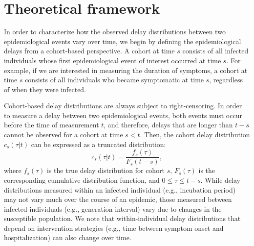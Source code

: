 \documentclass[12pt]{article}
\begin{document}
\section{Theoretical framework}

In order to characterize how the observed delay distributions between two epidemiological events vary over time, we begin by defining the epidemiological delays from a cohort-based perspective.
A cohort at time $s$ consists of all infected individuals whose first epidemiological event of interest occurred at time $s$.
For example, if we are interested in measuring the duration of symptoms, a cohort at time $s$ consists of all individuals who became symptomatic at time $s$, regardless of when they were infected.

Cohort-based delay distributions are always subject to right-censoring.
In order to measure a delay between two epidemiological events, both events must occur before the time of measurement $t$, and therefore, delays that are longer than $t-s$ cannot be observed for a cohort at time $s < t$.
Then, the cohort delay distribution $c_s(\tau|t)$ can be expressed as a truncated distribution:
\begin{equation}
c_s(\tau|t) = \frac{f_s(\tau)}{F_s(t-s)},
\label{eq:cohort}
\end{equation}
where $f_s(\tau)$ is the true delay distribution for cohort $s$, $F_s(\tau)$ is the corresponding cumulative distribution function, and $0 \leq \tau \leq t-s$.
While delay distributions measured within an infected individual (e.g., incubation period) may not vary much over the course of an epidemic, those measured between infected individuals (e.g., generation interval) vary due to changes in the susceptible population.
We note that within-individual delay distributions that depend on intervention strategies (e.g., time between symptom onset and hospitalization) can also change over time.
\end{document}
